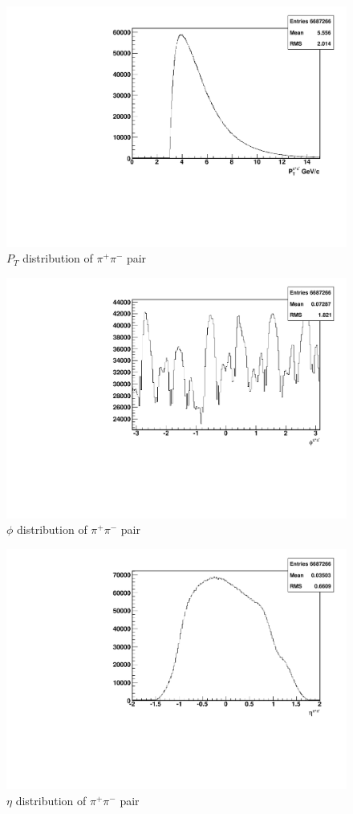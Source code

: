 \documentclass[letterpaper, abstract = on,listof=totoc, bibliography=totoc]{scrreprt}
\newcommand{\pip}{\pi^+}
\newcommand{\pim}{\pi^-}
\newcommand{\pair}{$\pip\pim$ }
\begin{document}
\begin{figure}
\begin{center}
\includegraphics[width = .8\textwidth]{hPtPair}
\caption[$P_{T}$ distribution of \pair pair]{$P_{T}$ distribution of \pair pair}
\label{fig:pt}
\end{center}
\end{figure}

\begin{figure}
\begin{center}
\includegraphics[width = .8\textwidth]{hPhiPair}
\caption[$\phi$ distribution of \pair pair]{$\phi$ distribution of \pair pair}
\label{fig:phi}
\end{center}
\end{figure}

\begin{figure}
\begin{center}
\includegraphics[width = .8\textwidth]{hEtaPair}
\caption[$\eta$ distribution of \pair pair]{$\eta$ distribution of \pair pair}
\label{fig:eta}
\end{center}
\end{figure}
\end{document}
